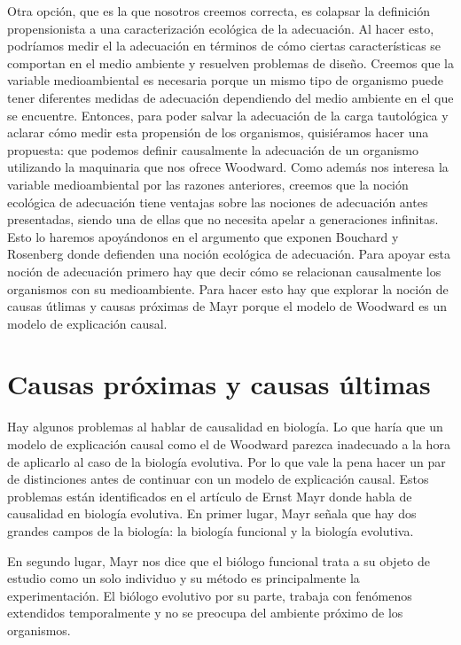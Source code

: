 Otra opción, que es la que nosotros creemos correcta, es colapsar la definición propensionista a una caracterización ecológica de la adecuación. Al hacer esto, podríamos medir el la adecuación en términos de cómo ciertas características se comportan en el medio ambiente y resuelven problemas de diseño. Creemos que la variable medioambiental es necesaria porque un mismo tipo de organismo puede tener diferentes medidas de adecuación dependiendo del medio ambiente en el que se encuentre. Entonces, para poder salvar la adecuación de la carga tautológica y aclarar cómo medir esta propensión de los organismos, quisiéramos hacer una propuesta: que podemos definir causalmente la adecuación de un organismo utilizando la maquinaria que nos ofrece Woodward. Como además nos interesa la variable medioambiental por las razones anteriores, creemos que la noción ecológica de adecuación tiene ventajas sobre las nociones de adecuación antes presentadas, siendo una de ellas que no necesita apelar a generaciones infinitas. Esto lo haremos apoyándonos en el argumento que exponen Bouchard y Rosenberg \citeyear{Bouchard2004} donde defienden una noción ecológica de adecuación. Para apoyar esta noción de adecuación primero hay que decir cómo se relacionan causalmente los organismos con su medioambiente. Para hacer esto hay que explorar la noción de causas útlimas y causas próximas de Mayr porque el modelo de Woodward es un modelo de explicación causal.

\section{Causas próximas y causas últimas}

Hay algunos problemas al hablar de causalidad en biología. Lo que haría que un modelo de explicación causal como el de Woodward parezca inadecuado a la hora de aplicarlo al caso de la biología evolutiva. Por lo que vale la pena hacer un par de distinciones antes de continuar con un modelo de explicación causal. Estos problemas están identificados en el artículo de Ernst Mayr \citeyear{Mayr1998} donde habla de causalidad en biología evolutiva. En primer lugar, Mayr señala que hay dos grandes campos de la biología: la biología funcional y la biología evolutiva.

En segundo lugar, Mayr nos dice que el biólogo funcional trata a su objeto de estudio como un solo individuo y su método es principalmente la experimentación. El biólogo evolutivo por su parte, trabaja con fenómenos extendidos temporalmente y no se preocupa del ambiente próximo de los organismos.


